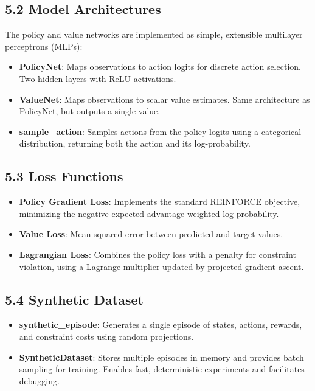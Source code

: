 \documentclass[conference]{IEEEtran}
\begin{document}
\subsection*{5.2 Model Architectures}
The policy and value networks are implemented as simple, extensible multilayer perceptrons (MLPs):
\begin{itemize}
  \item \textbf{PolicyNet}: Maps observations to action logits for discrete action selection. Two hidden layers with ReLU activations.
  \item \textbf{ValueNet}: Maps observations to scalar value estimates. Same architecture as PolicyNet, but outputs a single value.
  \item \textbf{sample\_action}: Samples actions from the policy logits using a categorical distribution, returning both the action and its log-probability.
\end{itemize}

\subsection*{5.3 Loss Functions}
\begin{itemize}
  \item \textbf{Policy Gradient Loss}: Implements the standard REINFORCE objective, minimizing the negative expected advantage-weighted log-probability.
  \item \textbf{Value Loss}: Mean squared error between predicted and target values.
  \item \textbf{Lagrangian Loss}: Combines the policy loss with a penalty for constraint violation, using a Lagrange multiplier updated by projected gradient ascent.
\end{itemize}

\subsection*{5.4 Synthetic Dataset}
\begin{itemize}
  \item \textbf{synthetic\_episode}: Generates a single episode of states, actions, rewards, and constraint costs using random projections.
  \item \textbf{SyntheticDataset}: Stores multiple episodes in memory and provides batch sampling for training. Enables fast, deterministic experiments and facilitates debugging.
\end{itemize}
\end{document}
